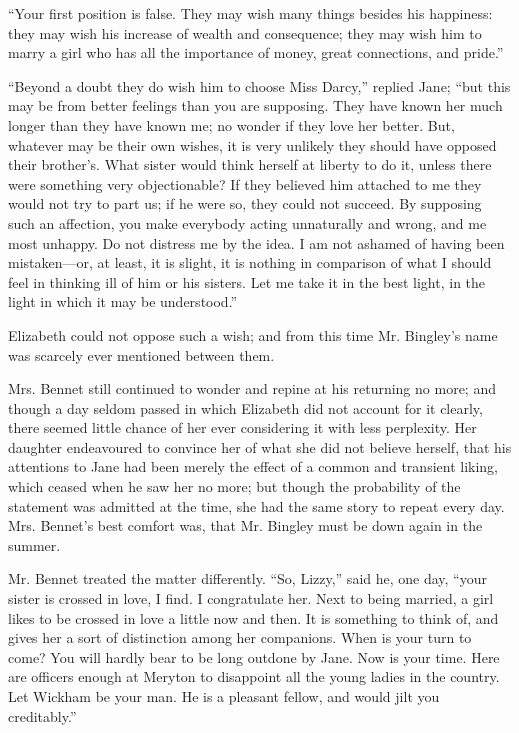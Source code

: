 \documentclass[12pt]{book}
\begin{document}
``Your first position is false. They may wish many things besides his happiness: they may wish his increase of wealth and consequence; they may wish him to marry a girl who has all the importance of money, great connections, and pride.''

``Beyond a doubt they do wish him to choose Miss Darcy,'' replied Jane; ``but this may be from better feelings than you are supposing. They have known her much longer than they have known me; no wonder if they love her better. But, whatever may be their own wishes, it is very unlikely they should have opposed their brother's. What sister would think herself at liberty to do it, unless there were something very objectionable? If they believed him attached to me they would not try to part us; if he were so, they could not succeed. By supposing such an affection, you make everybody acting unnaturally and wrong, and me most unhappy. Do not distress me by the idea. I am not ashamed of having been mistaken---or, at least, it is slight, it is nothing in comparison of what I should feel in thinking ill of him or his sisters. Let me take it in the best light, in the light in which it may be understood.''

Elizabeth could not oppose such a wish; and from this time Mr. Bingley's name was scarcely ever mentioned between them.

Mrs. Bennet still continued to wonder and repine at his returning no more; and though a day seldom passed in which Elizabeth did not account for it clearly, there seemed little chance of her ever considering it with less perplexity. Her daughter endeavoured to convince her of what she did not believe herself, that his attentions to Jane had been merely the effect of a common and transient liking, which ceased when he saw her no more; but though the probability of the statement was admitted at the time, she had the same story to repeat every day. Mrs. Bennet's best comfort was, that Mr. Bingley must be down again in the summer.

Mr. Bennet treated the matter differently. ``So, Lizzy,'' said he, one day, ``your sister is crossed in love, I find. I congratulate her. Next to being married, a girl likes to be crossed in love a little now and then. It is something to think of, and gives her a sort of distinction among her companions. When is your turn to come? You will hardly bear to be long outdone by Jane. Now is your time. Here are officers enough at Meryton to disappoint all the young ladies in the country. Let Wickham be your man. He is a pleasant fellow, and would jilt you creditably.''
\end{document}
